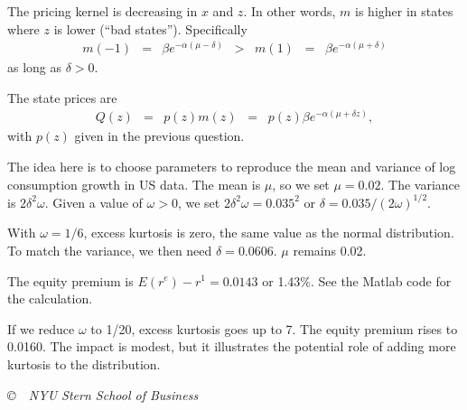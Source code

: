 \documentclass[11pt]{exam}
\begin{document}
\begin{questions}
\begin{solution}
\begin{parts}
\item The pricing kernel is decreasing in $x$ and $z$.
In other words, $m$ is higher in states where $z$ is lower (``bad states'').
Specifically
\begin{eqnarray*}
    m(-1) &=& \beta e^{-\alpha (\mu - \delta)}
        \;\;>\;\;     m(1) \;\;=\;\; \beta e^{-\alpha (\mu + \delta)}
\end{eqnarray*}
as long as $\delta > 0$.

\item The state prices are
\begin{eqnarray*}
    Q(z) &=& p(z) m(z)
            \;\;=\;\;  p(z) \beta e^{-\alpha (\mu + \delta z)} ,
\end{eqnarray*}
with $p(z)$ given in the previous question.


\item The idea here is to choose parameters to reproduce the mean and variance
of log consumption growth in US data.
The mean is $\mu$, so we set $\mu = 0.02$.
The variance is $2\delta^2 \omega$.
Given a value of $\omega > 0$,
we set $2\delta^2 \omega = 0.035^2$ or
$\delta = 0.035/(2\omega)^{1/2} $.

\item With $\omega = 1/6$, excess kurtosis is zero,
the same value as the normal distribution.
To match the variance, we then need $\delta = 0.0606$.
$\mu$ remains 0.02.

\item
The equity premium is
$ E(r^e) - r^1 = 0.0143$ or 1.43\%.
See the Matlab code for the calculation.

\item If we reduce $\omega$ to 1/20, excess kurtosis goes up to 7.
The equity premium rises to 0.0160.
The impact is modest, but it illustrates the potential role
of adding more kurtosis to the distribution.


\end{parts}
\end{solution}

\end{questions}

\vfill \centerline{\it \copyright \ \number\year \ NYU Stern School of Business}
\end{document}
